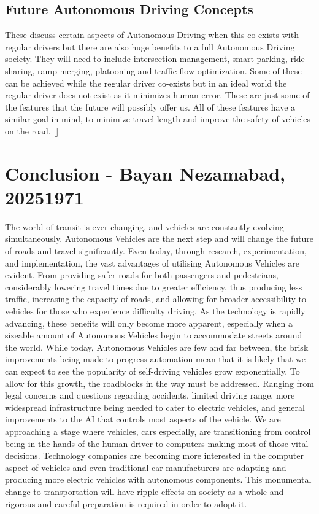 \documentclass{article}
\begin{document}
\subsection{Future Autonomous Driving Concepts}

These discuss certain aspects of Autonomous Driving when this co-exists with regular drivers but there are also huge benefits to a full Autonomous Driving society. They will need to include intersection management, smart parking, ride sharing, ramp merging, platooning and traffic flow optimization. Some of these can be achieved while the regular driver co-exists but in an ideal world the regular driver does not exist as it minimizes human error. These are just some of the features that the future will possibly offer us. All of these features have a similar goal in mind, to minimize travel length and improve the safety of vehicles on the road. [\textcite{mariani2021coordination}]

\section{Conclusion - Bayan Nezamabad, 20251971}
The world of transit is ever-changing, and vehicles are constantly evolving simultaneously. Autonomous Vehicles are the next step and will change the future of roads and travel significantly. Even today, through research, experimentation, and implementation, the vast advantages of utilising Autonomous Vehicles are evident. From providing safer roads for both passengers and pedestrians, considerably lowering travel times due to greater efficiency, thus producing less traffic, increasing the capacity of roads, and allowing for broader accessibility to vehicles for those who experience difficulty driving. As the technology is rapidly advancing, these benefits will only become more apparent, especially when a sizeable amount of Autonomous Vehicles begin to accommodate streets around the world. While today, Autonomous Vehicles are few and far between, the brisk improvements being made to progress automation mean that it is likely that we can expect to see the popularity of self-driving vehicles grow exponentially. To allow for this growth, the roadblocks in the way must be addressed. Ranging from legal concerns and questions regarding accidents, limited driving range, more widespread infrastructure being needed to cater to electric vehicles, and general improvements to the AI that controls most aspects of the vehicle.
\bigbreak
We are approaching a stage where vehicles, cars especially, are transitioning from control being in the hands of the human driver to computers making most of those vital decisions. Technology companies are becoming more interested in the computer aspect of vehicles and even traditional car manufacturers are adapting and producing more electric vehicles with autonomous components. This monumental change to transportation will have ripple effects on society as a whole and rigorous and careful preparation is required in order to adopt it.

\printbibliography
\end{document}
